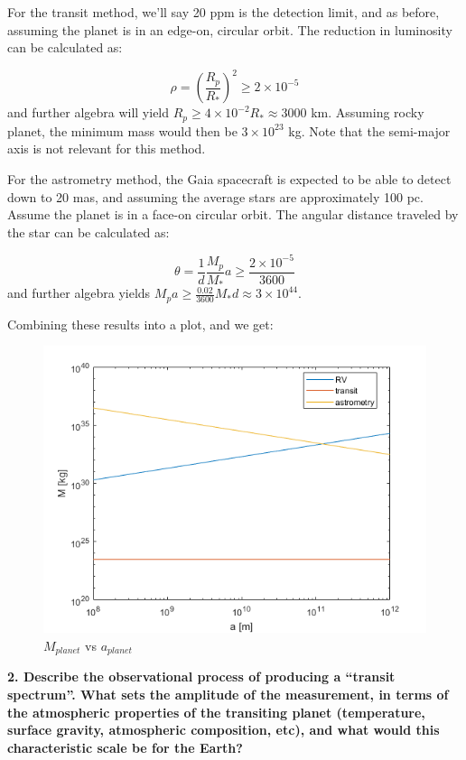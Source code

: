 \documentclass[12pt,preprint]{aastex61}
\begin{document}
For the transit method, we'll say 20 ppm is the detection limit, and as before, assuming the planet is in an edge-on, circular orbit. The reduction in luminosity can be calculated as:

\begin{equation}
\rho = \left( \frac{R_p}{R_*} \right)^2 \geq 2\times10^{-5}
\end{equation}
and further algebra will yield $ R_p \geq 4\times 10^{-2} R_* \approx 3000$ km. Assuming rocky planet, the minimum mass would then be $ 3\times 10^{23}$ kg. Note that the semi-major axis is not relevant for this method.

For the astrometry method, the Gaia spacecraft is expected to be able to detect down to 20 mas, and assuming the average stars are approximately 100 pc. Assume the planet is in a face-on circular orbit. The angular distance traveled by the star can be calculated as:

\begin{equation}
\theta = \frac{1}{d}\frac{M_p}{M_*}a \geq \frac{2\times 10^{-5}}{3600}
\end{equation}
and further algebra yields $M_pa \geq \frac{0.02}{3600} M_* d \approx 3 \times 10^{44}  $.

Combining these results into a plot, and we get:

\begin{figure}[h]
\includegraphics[scale=1]{prob1_plot.png}
\caption{$M_{planet}$ vs $a_{planet}$}
\centering	
\end{figure}

{\bf 2. Describe the observational process of producing a ``transit spectrum''. What sets the amplitude of the measurement, in terms of the atmospheric properties of the transiting planet (temperature, surface gravity, atmospheric composition, etc), and what would this characteristic scale be for the Earth?}
\end{document}

